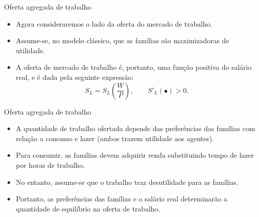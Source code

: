 \documentclass[10pt]{beamer}
\begin{document}
\begin{frame}{Oferta agregada de trabalho}
    \begin{itemize}
        \item Agora consideraremos o lado da oferta do mercado de trabalho.\bigskip

        \item Assume-se, no modelo clássico, que as famílias são maximizadoras de utilidade.\bigskip

        \item A oferta de mercado de trabalho é, portanto, uma função positiva do salário real, e é dada pela seguinte expressão:\medskip
              \begin{equation}
                  S_L = S_L\left(\frac{W}{P}\right), \qquad S'_L(\bullet)>0.
                  \label{eq9}
              \end{equation}
    \end{itemize}
\end{frame}

\begin{frame}{Oferta agregada de trabalho}
    \begin{itemize}
        \item A quantidade de trabalho ofertada depende das preferências das famílias com relação a consumo e lazer (ambos trazem utilidade aos agentes).\bigskip

        \item Para consumir, as famílias devem adquirir renda substituindo tempo de lazer por horas de trabalho.\bigskip

        \item No entanto, assume-se que o trabalho traz desutilidade para as famílias.\bigskip

        \item Portanto, as preferências das famílias e o salário real determinarão a quantidade de equilíbrio na oferta de trabalho.
    \end{itemize}
\end{frame}
\end{document}
